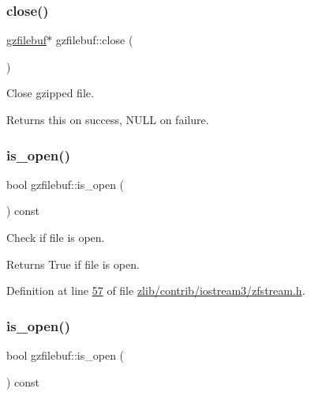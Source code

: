 \subsubsection{\texorpdfstring{close()}{close()}\hspace{0.1cm}{\footnotesize\ttfamily [2/2]}}
{\footnotesize\ttfamily \hyperlink{classgzfilebuf}{gzfilebuf}$\ast$ gzfilebuf\+::close (\begin{DoxyParamCaption}{ }\end{DoxyParamCaption})}



Close gzipped file. 

\begin{DoxyReturn}{Returns}
{\ttfamily this} on success, N\+U\+LL on failure. 
\end{DoxyReturn}
\mbox{\label{classgzfilebuf_a24dfb3e35c147aaf3a562c1ea4268757}} 
\subsubsection{\texorpdfstring{is\+\_\+open()}{is\_open()}\hspace{0.1cm}{\footnotesize\ttfamily [1/2]}}
{\footnotesize\ttfamily bool gzfilebuf\+::is\+\_\+open (\begin{DoxyParamCaption}{ }\end{DoxyParamCaption}) const\hspace{0.3cm}{\ttfamily [inline]}}



Check if file is open. 

\begin{DoxyReturn}{Returns}
True if file is open. 
\end{DoxyReturn}


Definition at line \hyperlink{zlib_2contrib_2iostream3_2zfstream_8h_source_l00057}{57} of file \hyperlink{zlib_2contrib_2iostream3_2zfstream_8h_source}{zlib/contrib/iostream3/zfstream.\+h}.

\mbox{\label{classgzfilebuf_a24dfb3e35c147aaf3a562c1ea4268757}} 
\subsubsection{\texorpdfstring{is\+\_\+open()}{is\_open()}\hspace{0.1cm}{\footnotesize\ttfamily [2/2]}}
{\footnotesize\ttfamily bool gzfilebuf\+::is\+\_\+open (\begin{DoxyParamCaption}{ }\end{DoxyParamCaption}) const\hspace{0.3cm}{\ttfamily [inline]}}



